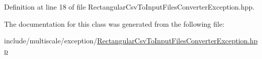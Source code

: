 Definition at line 18 of file Rectangular\-Csv\-To\-Input\-Files\-Converter\-Exception.\-hpp.



The documentation for this class was generated from the following file\-:\begin{DoxyCompactItemize}
\item 
include/multiscale/exception/\hyperlink{RectangularCsvToInputFilesConverterException_8hpp}{Rectangular\-Csv\-To\-Input\-Files\-Converter\-Exception.\-hpp}\end{DoxyCompactItemize}
